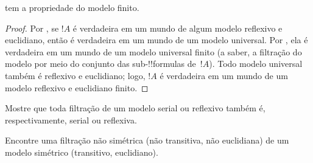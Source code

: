 \documentclass[../../../include/open-logic-section]{subfiles}
\begin{document}
\begin{cor}
   tem a propriedade do modelo finito.
\end{cor}

\begin{proof}
  Por , se $!A$ é verdadeira em um mundo
  de algum modelo reflexivo e euclidiano, então é verdadeira em um mundo
  de um modelo universal. Por , ela é verdadeira em
  um mundo de um modelo universal finito (a saber, a filtração do modelo
  por meio do conjunto das sub-!!{formula}s de~$!A$). Todo modelo
  universal também é reflexivo e euclidiano; logo, $!A$ é verdadeira em
  um mundo de um modelo reflexivo e euclidiano finito.
\end{proof}

\begin{prob}
  Mostre que toda filtração de um modelo serial ou reflexivo também é,
  respectivamente, serial ou reflexiva.
\end{prob}

\begin{prob}
  Encontre uma filtração não simétrica (não transitiva, não euclidiana)
  de um modelo simétrico (transitivo, euclidiano).
\end{prob}
\end{document}
